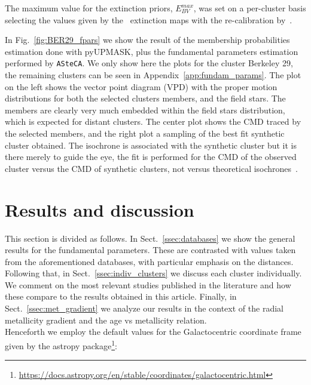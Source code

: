 \documentclass[draft]{aa}
\begin{document}
  \noindent The maximum value for the extinction priors, $E_{BV}^{max}$, was set
  on a per-cluster basis selecting the values given by the~\cite{Schlegel_1998}
  extinction maps with the re-calibration by~\cite{Schlafly_2011}.
  
  In Fig.~\ref{fig:BER29_fpars} we show the result of the membership
  probabilities estimation done with pyUPMASK, plus the fundamental parameters
  estimation performed by \texttt{ASteCA}. We only show here the plots for
  the cluster Berkeley 29, the remaining clusters can be seen in
  Appendix~\ref{app:fundam_params}.
  The plot on the left shows the vector point diagram (VPD) with the proper
  motion distributions for both the selected clusters members, and the field
  stars. The members are clearly very much embedded within the field stars
  distribution, which is expected for distant clusters. The center plot shows
  the CMD traced by the selected members, and the right plot a sampling of the
  best fit synthetic cluster obtained. The isochrone is associated with the
  synthetic cluster but it is there merely to guide the eye, the fit is
  performed for the CMD of the observed cluster versus the CMD of synthetic
  clusters, not versus theoretical isochrones~\citep[this is further
  explained in:][]{Perren_2015,Perren_2017,Perren_2020}.\\








\section{Results and discussion}
 \label{sec:results}

 This section is divided as follows.
 In Sect.~\ref{ssec:databases} we show the general results for the
 fundamental parameters. These are contrasted with values taken from the
 aforementioned databases, with particular emphasis on the distances.
 Following that, in Sect.~\ref{ssec:indiv_clusters} we discuss each cluster
 individually. We comment on the most relevant studies published in the
 literature and how these compare to the results obtained in this article.
 Finally, in Sect.~\ref{ssec:met_gradient} we analyze our results in the context
 of the radial metallicity gradient and the age vs metallicity relation.\\

 Henceforth we employ the default values for the Galactocentric coordinate
 frame given by the astropy
 package\footnote{\url{https://docs.astropy.org/en/stable/coordinates/galactocentric.html}}:
\end{document}
